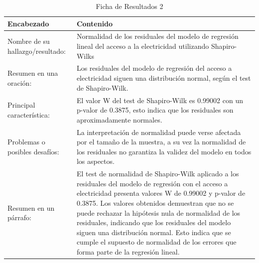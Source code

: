 \begin{table}[H]
    \caption{Ficha de Resultados 2}
    \begin{center}
        \begin{tabular}{  m{3cm} | m{12cm}  }
        \hline
        \textbf{ Encabezado} & \textbf{Contenido }\\ 
        \hline
        Nombre de su hallazgo/resultado: & Normalidad de los residuales del modelo de regresión lineal del acceso a la electricidad utilizando Shapiro-Wilks\\ 
        \hline
        Resumen en una oración: & Los residuales del modelo de regresión del acceso a electricidad siguen una distribución normal, según el test de Shapiro-Wilk.\\ 
        \hline
        Principal característica: & El valor W del test de Shapiro-Wilk es 0.99002 con un p-valor de 0.3875, esto indica que los residuales son aproximadamente normales. \\ 
        \hline
        Problemas o posibles desafíos: & La interpretación de normalidad puede verse afectada por el tamaño de la muestra, a su vez la normalidad de los residuales no garantiza la validez del modelo en todos los aspectos. \\ 
        \hline
        Resumen en un párrafo: & El test de normalidad de Shapiro-Wilk aplicado a los residuales del modelo de regresión con el acceso a electricidad presenta valores W de 0.99002 y p-valor de 0.3875. Los valores obtenidos demuestran que no se puede rechazar la hipótesis nula de normalidad de los residuales, indicando que los residuales del modelo siguen una distribución normal. Esto indica que se cumple el supuesto de normalidad de los errores que forma parte de la regresión lineal.\\ 
        \hline
        \end{tabular}
    \end{center}
\end{table}

